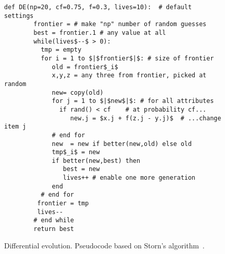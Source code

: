 \documentclass[sigconf,anonymous,review]{acmart}
\begin{document}
 \begin{figure}[!t]
    \small 
    \begin{lstlisting}[mathescape,linewidth=7.5cm,frame=none,numbers=right ]
      def DE(np=20, cf=0.75, f=0.3, lives=10):  # default settings
        frontier = # make "np" number of random guesses
        best = frontier.1 # any value at all
        while(lives$--$ > 0): 
          tmp = empty
          for i = 1 to $|$frontier$|$: # size of frontier
             old = frontier$_i$
             x,y,z = any three from frontier, picked at random
             new= copy(old)
             for j = 1 to $|$new$|$: # for all attributes
               if rand() < cf    # at probability cf...
                  new.j = $x.j + f(z.j - y.j)$  # ...change item j
             # end for
             new  = new if better(new,old) else old
             tmp$_i$ = new 
             if better(new,best) then
                best = new
                lives++ # enable one more generation
             end
          # end for
         frontier = tmp
         lives--
        # end while
        return best
    \end{lstlisting} 
    \caption{Differential evolution. Pseudocode based on Storn's algorithm~\cite{storn1997differential}.}
    \label{fig:pseudo_DE} 
    \vspace{-0.3cm}
    \end{figure}
\end{document}
